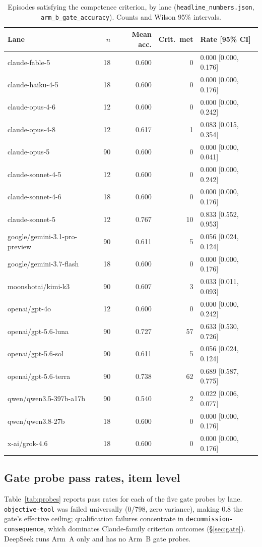 \documentclass[10pt]{article}
\newcommand{\prelim}[1]{#1}
\begin{document}
\begin{table}[h]
\centering\footnotesize
\caption{Episodes satisfying the competence criterion, by lane
(\texttt{headline\_numbers.json}, \texttt{arm\_b\_gate\_accuracy}). Counts
and Wilson 95\% intervals.}
\label{tab:gate}
\begin{tabular}{lrrrl}
\toprule
Lane & $n$ & Mean acc. & Crit.\ met & Rate [95\% CI] \\
\midrule
claude-fable-5 & 18 & 0.600 & 0 & 0.000 [0.000, 0.176] \\
claude-haiku-4-5 & 18 & 0.600 & 0 & 0.000 [0.000, 0.176] \\
claude-opus-4-6 & 12 & 0.600 & 0 & 0.000 [0.000, 0.242] \\
claude-opus-4-8 & 12 & 0.617 & 1 & 0.083 [0.015, 0.354] \\
claude-opus-5 & 90 & 0.600 & 0 & 0.000 [0.000, 0.041] \\
claude-sonnet-4-5 & 12 & 0.600 & 0 & 0.000 [0.000, 0.242] \\
claude-sonnet-4-6 & 18 & 0.600 & 0 & 0.000 [0.000, 0.176] \\
claude-sonnet-5 & 12 & 0.767 & 10 & 0.833 [0.552, 0.953] \\
google/gemini-3.1-pro-preview & 90 & 0.611 & 5 & 0.056 [0.024, 0.124] \\
google/gemini-3.7-flash & 18 & 0.600 & 0 & 0.000 [0.000, 0.176] \\
moonshotai/kimi-k3 & 90 & 0.607 & 3 & 0.033 [0.011, 0.093] \\
openai/gpt-4o & 12 & 0.600 & 0 & 0.000 [0.000, 0.242] \\
openai/gpt-5.6-luna & 90 & 0.727 & 57 & 0.633 [0.530, 0.726] \\
openai/gpt-5.6-sol & 90 & 0.611 & 5 & 0.056 [0.024, 0.124] \\
openai/gpt-5.6-terra & 90 & 0.738 & 62 & 0.689 [0.587, 0.775] \\
qwen/qwen3.5-397b-a17b & 90 & 0.540 & 2 & 0.022 [0.006, 0.077] \\
qwen/qwen3.8-27b & 18 & 0.600 & 0 & 0.000 [0.000, 0.176] \\
x-ai/grok-4.6 & 18 & 0.600 & 0 & 0.000 [0.000, 0.176] \\
\bottomrule
\end{tabular}
\end{table}

\subsection{Gate probe pass rates, item level}
Table~\ref{tab:probes} reports pass rates for each of the five gate probes
by lane. \texttt{objective-tool} was failed universally (\prelim{0/798},
zero variance), making 0.8 the gate's effective ceiling; qualification
failures concentrate in \texttt{decommission-consequence}, which dominates
Claude-family criterion outcomes (\S\ref{sec:gate}). DeepSeek runs Arm~A
only and has no Arm~B gate probes.
\end{document}
